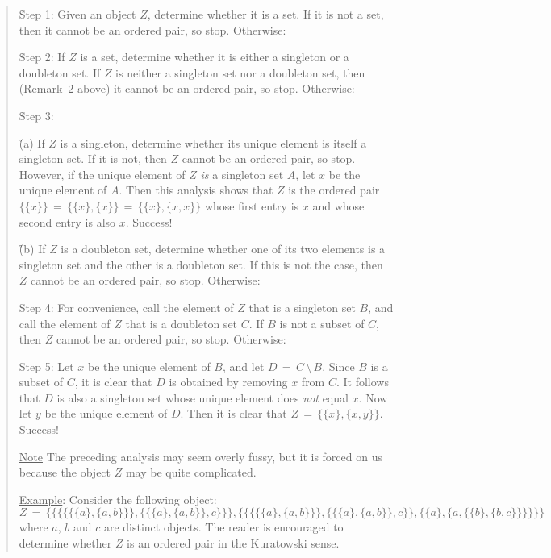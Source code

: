 {\begin{quotation}
{       \h Step 1: Given an object $Z$, determine whether it is a set.
    If it is not a set, then it cannot be an ordered pair, so stop. Otherwise:

       \h Step 2: If $Z$ is a set, determine whether it is either a singleton or a doubleton set.
    If $Z$ is neither a singleton set nor a doubleton set, then (Remark~2 above) it cannot be an ordered pair, so stop. Otherwise:

       \h Step 3:

            \h \h (a) If $Z$ is a singleton, determine whether its unique element is itself a singleton set.
    If it is not, then $Z$ cannot be an ordered pair, so stop. However, if the unique element of $Z$ {\em is} a singleton set $A$,
    let $x$ be the unique element of $A$. Then this analysis shows that $Z$ is the ordered pair $\{\{x\}\} \,=\, \{\{x\},\{x\}\} \,=\, \{\{x\},\{x,x\}\}$ 
    whose first entry is $x$ and whose second entry is also $x$. Success!

        \h \h (b) If $Z$ is a doubleton set, determine whether one of its two elements is a singleton set and the other is a doubleton set.
    If this is not the case, then $Z$ cannot be an ordered pair, so stop. Otherwise:

        Step 4: For convenience, call the element of $Z$ that is a singleton set $B$, and call the element of $Z$ that is a doubleton set $C$.
    If $B$ is not a subset of $C$, then $Z$ cannot be an ordered pair, so stop. Otherwise:

        Step 5: Let $x$ be the unique element of $B$, and let $D \,=\, C\,{\setminus}\,B$.
    Since $B$ is a subset of $C$, it is clear that $D$ is obtained by removing $x$ from $C$.
    It follows that $D$ is also a singleton set whose unique element does {\em not} equal $x$.
    Now let $y$ be the unique element of $D$. Then it is clear that $Z \,=\, \{\{x\},\{x,y\}\}$. Success!

\V

       \underline{Note} The preceding analysis may seem overly fussy, but it is forced on us because the object $Z$ may be quite complicated.

        \underline{Example}: Consider the following object:         \begin{displaymath}
Z \,=\, 
                \{
            \{
        \{
           \{
            \{
              \{a\},\{a,b\}
            \}
           \}
             ,
        \{
           \{\{a\},\{a,b\}\} , c
            \}
        \}
            \}
                         ,
            \{
        \{
           \{
            \{
              \{a\},\{a,b\}
            \}
           \}
             ,
        \{
           \{\{a\},\{a,b\}\} , c
            \}
        \},
          \{\{a\},\{a,\{\{b\},\{b,c\}\}\}\}
            \}
                \}
        \end{displaymath}
    where $a$, $b$ and $c$ are distinct objects.
    The reader is encouraged to determine whether $Z$ is an ordered pair in the Kuratowski sense.
}%
\end{quotation} 

}
